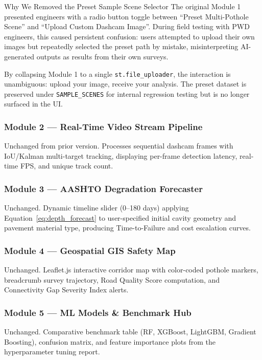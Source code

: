 \begin{designreflection}{Why We Removed the Preset Sample Scene Selector}
The original Module 1 presented engineers with a radio button toggle between ``Preset Multi-Pothole Scene'' and ``Upload Custom Dashcam Image''. During field testing with PWD engineers, this caused persistent confusion: users attempted to upload their own images but repeatedly selected the preset path by mistake, misinterpreting AI-generated outputs as results from their own surveys.

By collapsing Module 1 to a single \texttt{st.file\_uploader}, the interaction is unambiguous: upload your image, receive your analysis. The preset dataset is preserved under \texttt{SAMPLE\_SCENES} for internal regression testing but is no longer surfaced in the UI.
\end{designreflection}

\subsubsection{Module 2 --- Real-Time Video Stream Pipeline}
Unchanged from prior version. Processes sequential dashcam frames with IoU/Kalman multi-target tracking, displaying per-frame detection latency, real-time FPS, and unique track count.

\subsubsection{Module 3 --- AASHTO Degradation Forecaster}
Unchanged. Dynamic timeline slider (0--180 days) applying Equation~\ref{eq:depth_forecast} to user-specified initial cavity geometry and pavement material type, producing Time-to-Failure and cost escalation curves.

\subsubsection{Module 4 --- Geospatial GIS Safety Map}
Unchanged. Leaflet.js interactive corridor map with color-coded pothole markers, breadcrumb survey trajectory, Road Quality Score computation, and Connectivity Gap Severity Index alerts.

\subsubsection{Module 5 --- ML Models \& Benchmark Hub}
Unchanged. Comparative benchmark table (RF, XGBoost, LightGBM, Gradient Boosting), confusion matrix, and feature importance plots from the hyperparameter tuning report.


